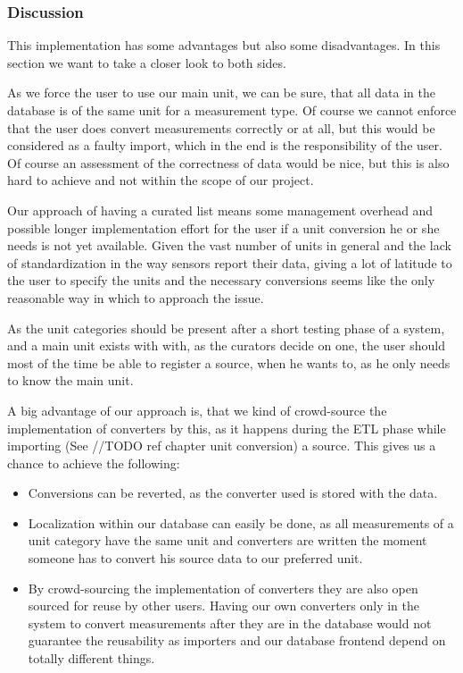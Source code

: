 \subsubsection{Discussion}\label{discussion}

This implementation has some advantages but also some disadvantages. In
this section we want to take a closer look to both sides.

As we force the user to use our main unit, we can be sure, that all data
in the database is of the same unit for a measurement type. Of course we
cannot enforce that the user does convert measurements correctly or at
all, but this would be considered as a faulty import, which in the end
is the responsibility of the user. Of course an assessment of the
correctness of data would be nice, but this is also hard to achieve and
not within the scope of our project.

Our approach of having a curated list means some management overhead and
possible longer implementation effort for the user if a unit conversion
he or she needs is not yet available. Given the vast number of units in
general and the lack of standardization in the way sensors report their
data, giving a lot of latitude to the user to specify the units and the
necessary conversions seems like the only reasonable way in which to
approach the issue.

As the unit categories should be present after a short testing phase of
a system, and a main unit exists with with, as the curators decide on
one, the user should most of the time be able to register a source, when
he wants to, as he only needs to know the main unit.

A big advantage of our approach is, that we kind of crowd-source the
implementation of converters by this, as it happens during the ETL phase
while importing (See //TODO ref chapter unit conversion) a source. This
gives us a chance to achieve the following:

\begin{itemize}
\tightlist
\item
  Conversions can be reverted, as the converter used is stored with the
  data.
\item
  Localization within our database can easily be done, as all
  measurements of a unit category have the same unit and converters are
  written the moment someone has to convert his source data to our
  preferred unit.
\item
  By crowd-sourcing the implementation of converters they are also open
  sourced for reuse by other users. Having our own converters only in
  the system to convert measurements after they are in the database
  would not guarantee the reusability as importers and our database
  frontend depend on totally different things.
\end{itemize}
